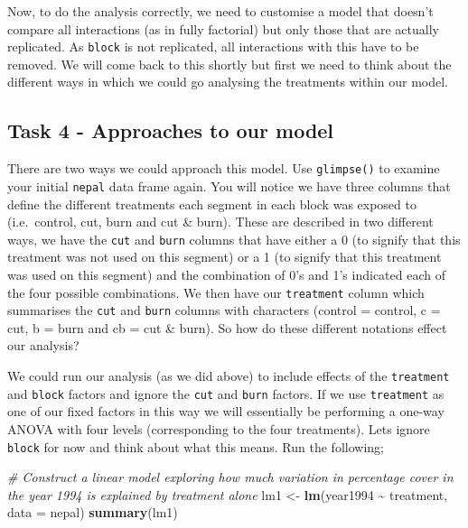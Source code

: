 \documentclass[
]{book}
\newenvironment{Shaded}{\begin{snugshade}}{\end{snugshade}}
\newcommand{\AttributeTok}[1]{\textcolor[rgb]{0.13,0.29,0.53}{#1}}
\newcommand{\CommentTok}[1]{\textcolor[rgb]{0.56,0.35,0.01}{\textit{#1}}}
\newcommand{\FunctionTok}[1]{\textcolor[rgb]{0.13,0.29,0.53}{\textbf{#1}}}
\newcommand{\NormalTok}[1]{#1}
\newcommand{\OtherTok}[1]{\textcolor[rgb]{0.56,0.35,0.01}{#1}}
\newcommand{\SpecialCharTok}[1]{\textcolor[rgb]{0.81,0.36,0.00}{\textbf{#1}}}
\begin{document}
Now, to do the analysis correctly, we need to customise a model that doesn't compare all interactions (as in fully factorial) but only those that are actually replicated. As \texttt{block} is not replicated, all interactions with this have to be removed. We will come back to this shortly but first we need to think about the different ways in which we could go analysing the treatments within our model.

\hypertarget{task-4---approaches-to-our-model}{%
\subsection{Task 4 - Approaches to our model}\label{task-4---approaches-to-our-model}}

There are two ways we could approach this model. Use \texttt{glimpse()} to examine your initial \texttt{nepal} data frame again. You will notice we have three columns that define the different treatments each segment in each block was exposed to (i.e.~control, cut, burn and cut \& burn). These are described in two different ways, we have the \texttt{cut} and \texttt{burn} columns that have either a 0 (to signify that this treatment was not used on this segment) or a 1 (to signify that this treatment was used on this segment) and the combination of 0's and 1's indicated each of the four possible combinations. We then have our \texttt{treatment} column which summarises the \texttt{cut} and \texttt{burn} columns with characters (control = control, c = cut, b = burn and cb = cut \& burn). So how do these different notations effect our analysis?

We could run our analysis (as we did above) to include effects of the \texttt{treatment} and \texttt{block} factors and ignore the \texttt{cut} and \texttt{burn} factors. If we use \texttt{treatment} as one of our fixed factors in this way we will essentially be performing a one-way ANOVA with four levels (corresponding to the four treatments). Lets ignore \texttt{block} for now and think about what this means. Run the following;

\begin{Shaded}
\begin{Highlighting}[]
\CommentTok{\# Construct a linear model exploring how much variation in percentage cover in the year 1994 is explained by treatment alone }
\NormalTok{lm1 }\OtherTok{\textless{}{-}} \FunctionTok{lm}\NormalTok{(year1994 }\SpecialCharTok{\textasciitilde{}}\NormalTok{ treatment, }\AttributeTok{data =}\NormalTok{ nepal)}
\FunctionTok{summary}\NormalTok{(lm1)}
\end{Highlighting}
\end{Shaded}
\end{document}
